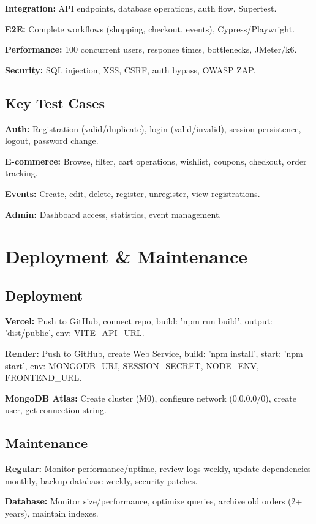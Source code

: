 ﻿\documentclass[11pt]{article}
\begin{document}
\textbf{Integration:} API endpoints, database operations, auth flow, Supertest.

\textbf{E2E:} Complete workflows (shopping, checkout, events), Cypress/Playwright.

\textbf{Performance:} 100 concurrent users, response times, bottlenecks, JMeter/k6.

\textbf{Security:} SQL injection, XSS, CSRF, auth bypass, OWASP ZAP.

\subsection{Key Test Cases}
\textbf{Auth:} Registration (valid/duplicate), login (valid/invalid), session persistence, logout, password change.

\textbf{E-commerce:} Browse, filter, cart operations, wishlist, coupons, checkout, order tracking.

\textbf{Events:} Create, edit, delete, register, unregister, view registrations.

\textbf{Admin:} Dashboard access, statistics, event management.

\section{Deployment \& Maintenance}

\subsection{Deployment}
\textbf{Vercel:} Push to GitHub, connect repo, build: 'npm run build', output: 'dist/public', env: VITE\_API\_URL.

\textbf{Render:} Push to GitHub, create Web Service, build: 'npm install', start: 'npm start', env: MONGODB\_URI, SESSION\_SECRET, NODE\_ENV, FRONTEND\_URL.

\textbf{MongoDB Atlas:} Create cluster (M0), configure network (0.0.0.0/0), create user, get connection string.

\subsection{Maintenance}
\textbf{Regular:} Monitor performance/uptime, review logs weekly, update dependencies monthly, backup database weekly, security patches.

\textbf{Database:} Monitor size/performance, optimize queries, archive old orders (2+ years), maintain indexes.
\end{document}
